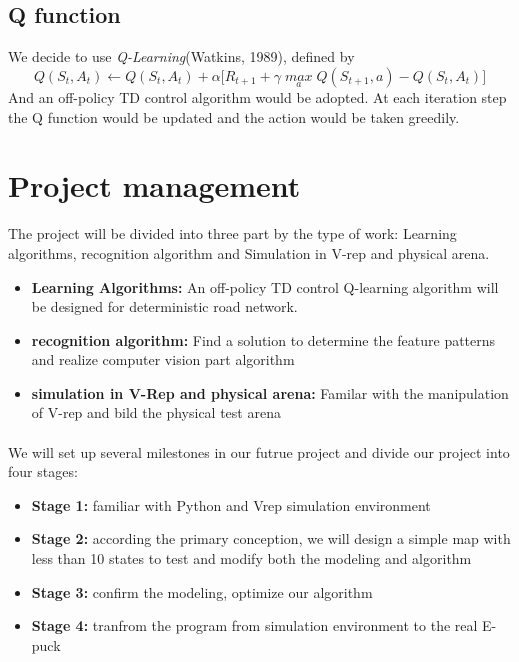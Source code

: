 \documentclass[
11pt, %
a4paper, %
oneside, %
headinclude%
BCOR3mm, %
]{scrartcl}
\begin{document}
\subsection{Q function}
\quad
We decide to use \textsl{Q-Learning}(Watkins, 1989)\cite{sutton1998reinforcement}, defined by
\begin{equation}
\mathit{Q(S_t,A_t)\xleftarrow{}  Q(S_t,A_t)+ }\alpha \mathit{[ R_{t+1} + }\gamma \mathit{\max \limits_{a}Q(S_{t+1},a)-Q(S_t,A_t)]}
\end{equation}
\quad And an off-policy TD control algorithm would be adopted.
At each iteration step the Q function would be updated and the action would be taken greedily.



\section{Project management}
\quad The project will be divided into three part by the type of work: Learning algorithms, recognition algorithm and Simulation in V-rep and physical arena.

\begin{itemize}[noitemsep]
\item \textbf{Learning Algorithms:} An off-policy TD control Q-learning algorithm will be designed for deterministic road network.
\item \textbf{recognition algorithm:} Find a solution to determine the feature patterns and realize computer vision part algorithm 
\item \textbf{ simulation in V-Rep and physical arena:}	Familar with the manipulation of V-rep and bild the physical test arena
\end{itemize}

\paragraph{}
We will set up several milestones in our futrue project and divide our project into four stages:
\begin{itemize}[noitemsep]
\item \textbf{Stage 1:} familiar with Python and Vrep simulation environment

\item \textbf{Stage 2:} according the primary conception, 
we will design a simple map with less than 10 states to test and modify both the modeling and algorithm

\item \textbf{Stage 3:} confirm the modeling, optimize our algorithm
\item \textbf{Stage 4:} tranfrom the program from simulation environment to the real E-puck
\end{itemize}




\end{document}
